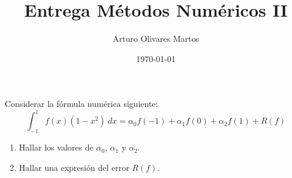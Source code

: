 \documentclass[12pt]{article}
\author{Arturo Olivares Martos}
\date{\today}
\title{Entrega Métodos Numéricos II}
\begin{document}
    \maketitle
    
    \begin{ejercicio}
        Considerar la fórmula numérica siguiente:
        \begin{equation*}
            \int_{-1}^1f(x)(1-x^2)\ dx=\alpha_0f(-1)+\alpha_1f(0)+\alpha_2f(1)+R(f)
        \end{equation*}
        \begin{enumerate}
            \item Hallar los valores de $\alpha_0$, $\alpha_1$ y $\alpha_2$.
            \item Hallar una expresión del error $R(f)$.
        \end{enumerate}
    \end{ejercicio}    
    
\end{document}
